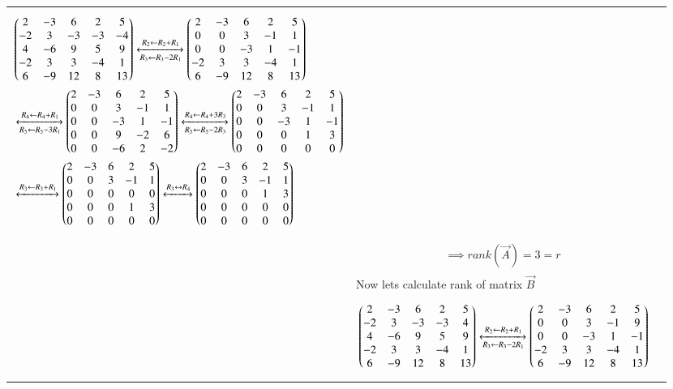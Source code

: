 \documentclass[journal,12pt]{IEEEtran}
\begin{document}
\begin{longtable}{|l|l|l|}
{\begin{align}
    &\begin{pmatrix}2&-3&6&2&5\\-2&3&-3&-3&-4\\4&-6&9&5&9\\-2&3&3&-4&1\\6&-9&12&8&13\end{pmatrix}\xleftrightarrow[R_3\leftarrow R_3-2R_1]{R_2\leftarrow R_2+R_1}\begin{pmatrix}2&-3&6&2&5\\0&0&3&-1&1\\0&0&-3&1&-1\\-2&3&3&-4&1\\6&-9&12&8&13\end{pmatrix}\\&\xleftrightarrow[R_5\leftarrow R_5-3R_1]{R_4\leftarrow R_4+R_1}\begin{pmatrix}2&-3&6&2&5\\0&0&3&-1&1\\0&0&-3&1&-1\\0&0&9&-2&6\\0&0&-6&2&-2\end{pmatrix}\xleftrightarrow[R_5\leftarrow R_5-2R_3]{R_4\leftarrow R_4+3R_3}\begin{pmatrix}2&-3&6&2&5\\0&0&3&-1&1\\0&0&-3&1&-1\\0&0&0&1&3\\0&0&0&0&0\end{pmatrix}\\&\xleftrightarrow[]{R_3\leftarrow R_3+R_1}\begin{pmatrix}2&-3&6&2&5\\0&0&3&-1&1\\0&0&0&0&0\\0&0&0&1&3\\0&0&0&0&0\end{pmatrix}\xleftrightarrow[]{R_3\leftrightarrow R_4}\begin{pmatrix}2&-3&6&2&5\\0&0&3&-1&1\\0&0&0&1&3\\0&0&0&0&0\\0&0&0&0&0\end{pmatrix}
\end{align}}&\\&\parbox{14cm}{\begin{align}
    \implies rank(\vec{A})=3=r\label{ra}
\end{align}}&\\&Now lets calculate rank of matrix $\vec{B}$&\\&\parbox{14cm}{\begin{align}
    &\myvec{2&-3&6&2&5\\-2&3&-3&-3&4\\4&-6&9&5&9\\-2&3&3&-4&1\\6&-9&12&8&13}\xleftrightarrow[R_3\leftarrow R_3-2R_1]{R_2\leftarrow R_2+R_1}\myvec{2&-3&6&2&5\\0&0&3&-1&9\\0&0&-3&1&-1\\-2&3&3&-4&1\\6&-9&12&8&13}\\

\end{align}}
\end{longtable}
\end{document}
